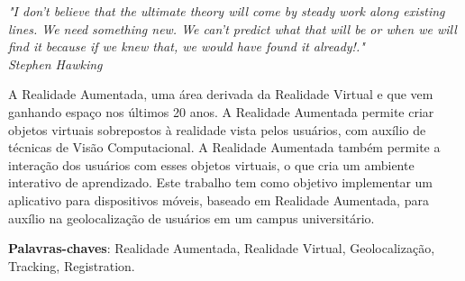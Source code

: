 \documentclass[12pt,openright,twoside,a4paper,english,french,spanish]{abntex2}
\begin{document}
\frenchspacing 


\imprimircapa

\imprimirfolhaderosto*






\begin{epigrafe}
    \vspace*{\fill}
	\begin{flushright}
		\textit{"I don't believe that the ultimate theory will come by steady work along existing lines. We need something new. We can't predict what that will be or when we will find it because if we knew that, we would have found it already!." \\Stephen Hawking}
	\end{flushright}
\end{epigrafe}


\begin{resumo}
    A Realidade Aumentada, uma área derivada da Realidade Virtual e que vem 
    ganhando espaço nos últimos 20 anos.  A Realidade Aumentada permite 
    criar objetos virtuais sobrepostos à realidade vista pelos usuários, com 
    auxílio de técnicas de Visão Computacional. A Realidade Aumentada também permite a 
    interação dos usuários com esses objetos virtuais, o que cria um ambiente 
    interativo de aprendizado. 
    Este trabalho tem como objetivo implementar  um 
    aplicativo para dispositivos móveis, baseado em Realidade Aumentada, para auxílio 
    na geolocalização de usuários em um campus universitário.

 \vspace{\onelineskip}
    
 \noindent
 \textbf{Palavras-chaves}: Realidade Aumentada, Realidade Virtual, Geolocalização, Tracking, Registration.
\end{resumo}
\end{document}
